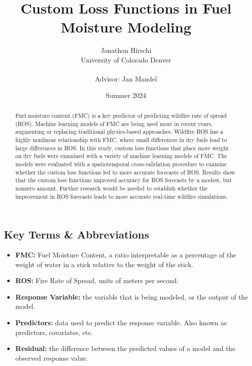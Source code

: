 \documentclass[11pt]{article}%
\begin{document}
\title{Custom Loss Functions in Fuel Moisture Modeling}
\author{
    \begin{tabular}[t]{c}
        Jonathon Hirschi \\
        University of Colorado Denver \\
        \\
        Advisor: Jan Mandel
    \end{tabular}
}

\date{Summer 2024}
\maketitle

\begin{abstract}
Fuel moisture content (FMC) is a key predictor of predicting wildfire rate of spread (ROS). Machine learning models of FMC are being used more in recent years, augmenting or replacing traditional physics-based approaches. Wildfire ROS has a highly nonlinear relationship with FMC, where small differences in dry fuels lead to large differences in ROS. In this study, custom loss functions that place more weight on dry fuels were examined with a variety of machine learning models of FMC. The models were evaluated with a spatiotemporal cross-validation procedure to examine whether the custom loss functions led to more accurate forecasts of ROS. Results show that the custom loss functions improved accuracy for ROS forecasts by a modest, but nonzero amount. Further research would be needed to establish whether the improvement in ROS forecasts leads to more accurate real-time wildfire simulations.
\end{abstract}

\subsection*{Key Terms \& Abbreviations}
\begin{itemize}
    \item \textbf{FMC:} Fuel Moisture Content, a ratio interpretable as a percentage of the weight of water in a stick relative to the weight of the stick.
    \item \textbf{ROS:} Fire Rate of Spread, units of meters per second.
    \item \textbf{Response Variable:} the variable that is being modeled, or the output of the model.
    \item \textbf{Predictors:} data used to predict the response variable. Also known as predictors, covariates, etc.
    \item \textbf{Residual:} the difference between the predicted values of a model and the observed response value.
\end{itemize}
\end{document}
